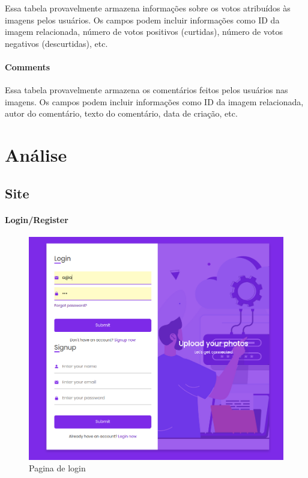 \documentclass{report}
\begin{document}
\indent Essa tabela provavelmente armazena informações sobre os votos atribuídos às imagens pelos usuários.
Os campos podem incluir informações como ID da imagem relacionada, número de votos positivos (curtidas), número de votos negativos (descurtidas), etc.\\

\subsubsection{Comments}

\indent Essa tabela provavelmente armazena os comentários feitos pelos usuários nas imagens.
Os campos podem incluir informações como ID da imagem relacionada, autor do comentário, texto do comentário, data de criação, etc.\\


\chapter{Análise}
\label{chap.analise}
\section{Site}

\subsubsection{Login/Register}

\begin{figure}[H]
    \centering
    \includegraphics[scale=0.2]{../images/login}
    \caption{Pagina de login}
    \label{fig:login}
\end{figure}
\end{document}
